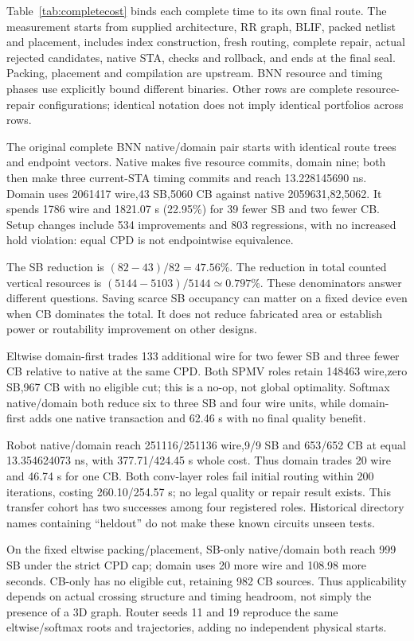 \documentclass[conference,10pt]{IEEEtran}
\begin{document}
Table~\ref{tab:completecost} binds each complete time to its own final route. The measurement starts from supplied architecture, RR graph, BLIF, packed netlist and placement, includes index construction, fresh routing, complete repair, actual rejected candidates, native STA, checks and rollback, and ends at the final seal. Packing, placement and compilation are upstream. BNN resource and timing phases use explicitly bound different binaries. Other rows are complete resource-repair configurations; identical notation does not imply identical portfolios across rows.

The original complete BNN native/domain pair starts with identical route trees and endpoint vectors. Native makes five resource commits, domain nine; both then make three current-STA timing commits and reach 13.228145690 ns. Domain uses 2061417 wire,43 SB,5060 CB against native 2059631,82,5062. It spends 1786 wire and 1821.07 s (22.95\%) for 39 fewer SB and two fewer CB. Setup changes include 534 improvements and 803 regressions, with no increased hold violation: equal CPD is not endpointwise equivalence.

The SB reduction is $(82-43)/82=47.56\%$. The reduction in total counted vertical resources is $(5144-5103)/5144\simeq 0.797\%$. These denominators answer different questions. Saving scarce SB occupancy can matter on a fixed device even when CB dominates the total. It does not reduce fabricated area or establish power or routability improvement on other designs.

Eltwise domain-first trades 133 additional wire for two fewer SB and three fewer CB relative to native at the same CPD. Both SPMV roles retain 148463 wire,zero SB,967 CB with no eligible cut; this is a no-op, not global optimality. Softmax native/domain both reduce six to three SB and four wire units, while domain-first adds one native transaction and 62.46 s with no final quality benefit.

Robot native/domain reach 251116/251136 wire,9/9 SB and 653/652 CB at equal 13.354624073 ns, with 377.71/424.45 s whole cost. Thus domain trades 20 wire and 46.74 s for one CB. Both conv-layer roles fail initial routing within 200 iterations, costing 260.10/254.57 s; no legal quality or repair result exists. This transfer cohort has two successes among four registered roles. Historical directory names containing ``heldout'' do not make these known circuits unseen tests.

On the fixed eltwise packing/placement, SB-only native/domain both reach 999 SB under the strict CPD cap; domain uses 20 more wire and 108.98 more seconds. CB-only has no eligible cut, retaining 982 CB sources. Thus applicability depends on actual crossing structure and timing headroom, not simply the presence of a 3D graph. Router seeds 11 and 19 reproduce the same eltwise/softmax roots and trajectories, adding no independent physical starts.
\end{document}

